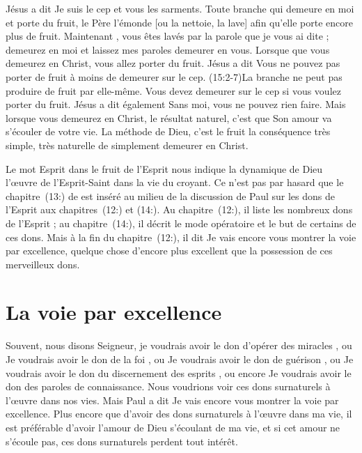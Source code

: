 Jésus a dit\frcolon{} \Og Je suis le cep et vous les sarments.
 Toute branche qui demeure en moi et porte du fruit,
 le Père l'émonde [ou la nettoie, la lave] afin qu'elle porte
 encore plus de fruit. Maintenant , vous êtes lavés par la parole
 que je vous ai dite ; demeurez en moi et laissez mes paroles
 demeurer en vous. \Fg{}
 Lorsque que vous demeurez en Christ, vous allez porter du fruit.
 Jésus a dit\frcolon{} \Og Vous ne pouvez pas porter de fruit à moins
 de demeurer sur le cep. \Fg{} (15:2-7)La branche
 ne peut pas produire de fruit par elle-même.
 Vous devez demeurer sur le cep si vous voulez porter du fruit.
 Jésus a dit également\frcolon{} \Og Sans moi, vous ne pouvez rien faire. \Fg{}
 Mais lorsque vous demeurez en Christ, le résultat naturel,
 c'est que Son amour va s'écouler de votre vie.
 La méthode de Dieu, c'est le fruit \ocadr la conséquence très simple,
 très naturelle de simplement demeurer en Christ.

Le mot \Og Esprit \Fg{} dans \Og le fruit de l'Esprit \Fg{}
 nous indique la dynamique de Dieu \ocadr l'œuvre de l'Esprit-Saint
 dans la vie du croyant. Ce n'est pas par hasard que le
 chapitre~(13:) de  est inséré
 au milieu de la discussion de Paul sur les dons de l'Esprit
 aux chapitres~(12:) et (14:).
 Au chapitre~(12:), il liste les nombreux dons de l'Esprit ;
 au chapitre~(14:), il décrit le mode opératoire
 et le but de certains de ces dons.
 Mais à la fin du chapitre~(12:), il dit\frcolon{}
 \Og Je vais encore vous montrer la voie par excellence, \Fg{}
 quelque chose d'encore plus excellent que la possession de ces merveilleux dons.


\section{La voie par excellence}

Souvent, nous disons\frcolon{}
 \Og Seigneur, je voudrais avoir le don d'opérer des miracles \Fg{}, ou\frcolon{}
 \Og Je voudrais avoir le don de la foi \Fg{}, ou\frcolon{}
 \Og Je voudrais avoir le don de guérison \Fg{}, ou\frcolon{}
 \Og Je voudrais avoir le don du discernement des esprits \Fg{}, ou encore\frcolon{}
 \Og Je voudrais avoir le don des paroles de connaissance. \Fg{}
 Nous voudrions voir ces dons surnaturels à l'œuvre dans nos vies.
 Mais Paul a dit\frcolon{}
 \Og Je vais encore vous montrer la voie par excellence. \Fg{}
 Plus encore que d'avoir des dons surnaturels à l'œuvre dans ma vie,
 il est préférable d'avoir l'amour de Dieu s'écoulant de ma vie,
 et si cet amour ne s'écoule pas, ces dons surnaturels perdent tout intérêt.

